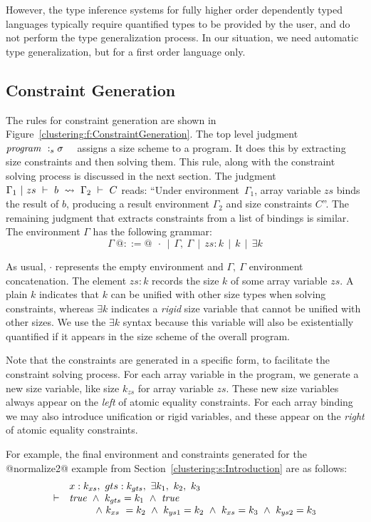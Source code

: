 However, the type inference systems for fully higher order dependently typed languages typically require quantified types to be provided by the user, and do not perform the type generalization process. In our situation, we need automatic type generalization, but for a first order language only.


\subsection{Constraint Generation}
The rules for constraint generation are shown in Figure~\ref{clustering:f:ConstraintGeneration}. The top level judgment ~~$\mathit{program} ~:_{s} \sigma$~~ assigns a size scheme to a program. It does this by extracting size constraints and then solving them. This rule, along with the constraint solving process is discussed in the next section. The judgment ~~$\Gamma_1 ~|~ zs ~\vdash~ b ~\leadsto~ \Gamma_2 ~\vdash~ C$ reads: ``Under environment~$\Gamma_1$, array variable $zs$ binds the result of $b$, producing a result environment $\Gamma_2$ and size constraints $C$''. The remaining judgment that extracts constraints from a list of bindings is similar. The environment $\Gamma$ has the following grammar:
$$
\Gamma~ @::=@ ~~\cdot ~~|~~ \Gamma,~ \Gamma ~~|~~ zs : k ~~|~~ k ~~|~~ \exists k
$$

As usual, $\cdot$ represents the empty environment and  $\Gamma,~ \Gamma$
environment concatenation. The element $zs : k$ records the size $k$ of some
array variable $zs$. A plain $k$ indicates that $k$ can be unified with other
size types when solving constraints, whereas $\exists k$ indicates a  \emph{rigid} size variable that cannot be unified with other sizes. We use the $\exists k$ syntax because this variable will also be existentially quantified if it appears in the size scheme of the overall program.

Note that the constraints are generated in a specific form, to facilitate the constraint solving process. For each array variable in the program, we generate a new size variable, like size $k_{zs}$ for array variable $zs$. These new size variables always appear on the \emph{left} of atomic equality constraints. For each array binding we may also introduce unification or rigid variables, and these appear on the \emph{right} of atomic equality constraints.

For example, the final environment and constraints generated for the @normalize2@ example from Section~\ref{clustering:s:Introduction} are as follows:
$$
\begin{array}{ll}
       & x : k_{xs},~ gts : k_{gts},~ \exists k_1,~ k_2,~ k_3 
\\
\vdash & \mathit{true} 
        ~\wedge~  k_{gts} = k_1
        ~\wedge~  \mathit{true}
\\     &~~~~~~~~ 
          \wedge~  k_{xs}  ~= k_2
        ~ \wedge~  k_{ys1}  = k_2 
        ~ \wedge~  k_{xs}   = k_3
        ~ \wedge~  k_{ys2}  = k_3
\end{array}
$$

